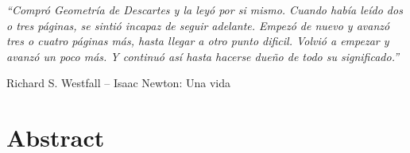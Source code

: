 \documentclass[a4paper,11pt,twoside]{book}
\begin{document}


\clearpage\thispagestyle{empty}\mbox{}\clearpage

\vspace*{0.2\textheight}

{\large \textit{ {\huge ``}Compr\'o Geometr\'ia de Descartes y la ley\'o por si mismo.
Cuando hab\'ia le\'ido dos o tres p\'aginas, se sinti\'o incapaz de seguir
adelante. Empez\'o de nuevo y avanz\'o tres o cuatro p\'aginas m\'as, hasta
llegar a otro punto dificil. Volvi\'o a empezar y avanz\'o un poco m\'as. Y
continu\'o as\'i hasta hacerse dueño de todo su significado.{\huge ''}}}
\begin{flushright}
  Richard S. Westfall -- Isaac Newton: Una vida
\end{flushright}

\clearpage\thispagestyle{empty}\mbox{}\clearpage

\chapter*{Abstract}

\end{document}
